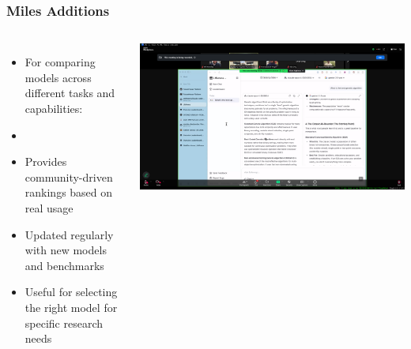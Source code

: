 \documentclass[aspectratio=169]{beamer}
\begin{document}
\begin{frame}
    \frametitle{Miles Additions}
    
    \begin{columns}
        \begin{itemize}
            \item For comparing models across different tasks and capabilities:
            \item {}
            \item Provides community-driven rankings based on real usage
            \item Updated regularly with new models and benchmarks
            \item Useful for selecting the right model for specific research needs
        \end{itemize}
        
        \includegraphics[width=\textwidth]{figures/lmarena_screenshot.png}
    \end{columns}
\end{frame}
\end{document}
